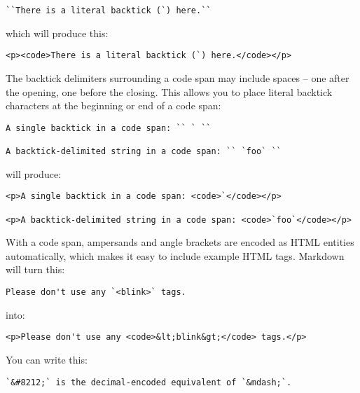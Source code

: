 \begin{lstlisting}
``There is a literal backtick (`) here.``
\end{lstlisting}




which will produce this:

\begin{lstlisting}
<p><code>There is a literal backtick (`) here.</code></p>
\end{lstlisting}




The backtick delimiters surrounding a code span may include spaces --
one after the opening, one before the closing. This allows you to place
literal backtick characters at the beginning or end of a code span:

\begin{lstlisting}
A single backtick in a code span: `` ` ``

A backtick-delimited string in a code span: `` `foo` ``
\end{lstlisting}




will produce:

\begin{lstlisting}
<p>A single backtick in a code span: <code>`</code></p>

<p>A backtick-delimited string in a code span: <code>`foo`</code></p>
\end{lstlisting}




With a code span, ampersands and angle brackets are encoded as HTML
entities automatically, which makes it easy to include example HTML
tags. Markdown will turn this:

\begin{lstlisting}
Please don't use any `<blink>` tags.
\end{lstlisting}




into:

\begin{lstlisting}
<p>Please don't use any <code>&lt;blink&gt;</code> tags.</p>
\end{lstlisting}




You can write this:

\begin{lstlisting}
`&#8212;` is the decimal-encoded equivalent of `&mdash;`.
\end{lstlisting}




